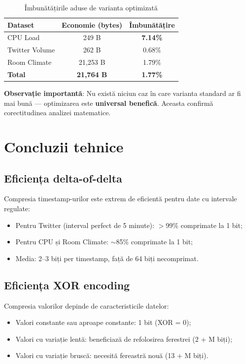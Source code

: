 \begin{table}[h]
\centering
\begin{tabular}{@{}lcc@{}}
\toprule
\textbf{Dataset} & \textbf{Economie (bytes)} & \textbf{Îmbunătățire} \\
\midrule
CPU Load & 249 B & \textbf{7.14\%} \\
Twitter Volume & 262 B & 0.68\% \\
Room Climate & 21,253 B & 1.79\% \\
\midrule
\textbf{Total} & \textbf{21,764 B} & \textbf{1.77\%} \\
\bottomrule
\end{tabular}
\caption{Îmbunătățirile aduse de varianta optimizată}
\end{table}

\textbf{Observație importantă}: Nu există niciun caz în care varianta standard ar fi mai bună --- optimizarea este \textbf{universal benefică}. Aceasta confirmă corectitudinea analizei matematice.

\section{Concluzii tehnice}

\subsection{Eficiența delta-of-delta}

Compresia timestamp-urilor este extrem de eficientă pentru date cu intervale regulate:
\begin{itemize}
    \item Pentru Twitter (interval perfect de 5 minute): $>$99\% comprimate la 1 bit;
    \item Pentru CPU și Room Climate: $\sim$85\% comprimate la 1 bit;
    \item Media: 2--3 biți per timestamp, față de 64 biți necomprimat.
\end{itemize}

\subsection{Eficiența XOR encoding}

Compresia valorilor depinde de caracteristicile datelor:
\begin{itemize}
    \item Valori constante sau aproape constante: 1 bit (XOR = 0);
    \item Valori cu variație lentă: beneficiază de refolosirea ferestrei (2 + M biți);
    \item Valori cu variație bruscă: necesită fereastră nouă (13 + M biți).
\end{itemize}

